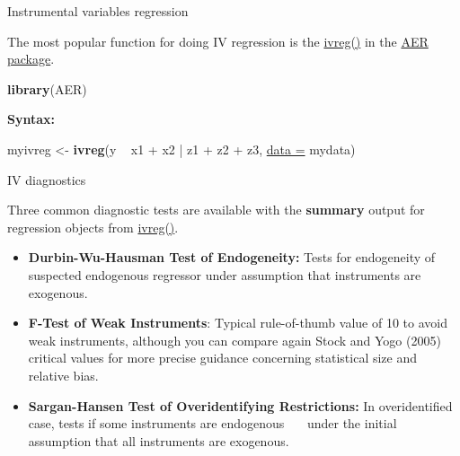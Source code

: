 \documentclass[ignorenonframetext,]{beamer}
\newenvironment{Shaded}{\begin{snugshade}}{\end{snugshade}}
\newcommand{\KeywordTok}[1]{\textcolor[rgb]{0.26,0.66,0.93}{\textbf{#1}}}
\newcommand{\DataTypeTok}[1]{\textcolor[rgb]{0.74,0.68,0.62}{\underline{#1}}}
\newcommand{\StringTok}[1]{\textcolor[rgb]{0.02,0.61,0.04}{#1}}
\newcommand{\OperatorTok}[1]{\textcolor[rgb]{0.74,0.68,0.62}{#1}}
\newcommand{\NormalTok}[1]{\textcolor[rgb]{0.74,0.68,0.62}{#1}}
\begin{document}
\begin{frame}[fragile]{Instrumental variables regression}

The most popular function for doing IV regression is the
\href{https://www.rdocumentation.org/packages/AER/versions/1.2-5/topics/ivreg}{ivreg()}
in the \href{https://www.rdocumentation.org/packages/AER}{AER package}.

\begin{Shaded}
\begin{Highlighting}[]
\KeywordTok{library}\NormalTok{(AER)}
\end{Highlighting}
\end{Shaded}

\textbf{Syntax:}

\begin{Shaded}
\begin{Highlighting}[]
\NormalTok{myivreg <-}\StringTok{ }\KeywordTok{ivreg}\NormalTok{(y }\OperatorTok{~}\StringTok{ }\NormalTok{x1 }\OperatorTok{+}\StringTok{ }\NormalTok{x2 }\OperatorTok{|}\StringTok{ }\NormalTok{z1 }\OperatorTok{+}\StringTok{ }\NormalTok{z2 }\OperatorTok{+}\StringTok{ }\NormalTok{z3, }
                 \DataTypeTok{data =}\NormalTok{ mydata)}
\end{Highlighting}
\end{Shaded}

\end{frame}

\begin{frame}{IV diagnostics}

Three common diagnostic tests are available with the \textbf{summary}
output for regression objects from
\href{https://www.rdocumentation.org/packages/AER/versions/1.2-5/topics/ivreg}{ivreg()}.

\begin{itemize}
\item
  \textbf{Durbin-Wu-Hausman Test of Endogeneity:} Tests for endogeneity
  of suspected endogenous regressor under assumption that instruments
  are exogenous.
\item
  \textbf{F-Test of Weak Instruments}: Typical rule-of-thumb value of 10
  to avoid weak instruments, although you can compare again Stock and
  Yogo (2005) critical values for more precise guidance concerning
  statistical size and relative bias.
\item
  \textbf{Sargan-Hansen Test of Overidentifying Restrictions:} In
  overidentified case, tests if some instruments are endogenous ~~~under
  the initial assumption that all instruments are exogenous.
\end{itemize}

\end{frame}
\end{document}
